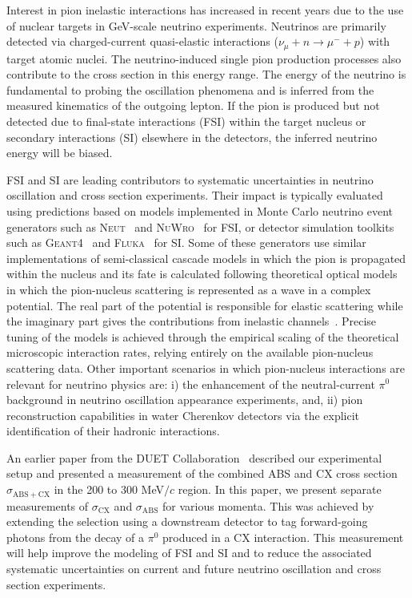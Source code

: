 Interest in pion inelastic interactions has increased in recent years due to the use of nuclear targets in GeV-scale neutrino experiments. Neutrinos are primarily detected via charged-current quasi-elastic interactions ($\nu_{\mu}+n\rightarrow \mu^{-} + p$) with target atomic nuclei. The neutrino-induced single pion production processes also contribute to the cross section in this energy range. The energy of the neutrino is fundamental to probing the oscillation phenomena and is inferred from the measured kinematics of the outgoing lepton. If the pion is produced but not detected due to final-state interactions (FSI) within the target nucleus or secondary interactions (SI) elsewhere in the detectors, the inferred neutrino energy will be biased. 

FSI and SI are leading contributors to systematic uncertainties in neutrino oscillation and cross section experiments. Their impact is typically evaluated using predictions based on models implemented in Monte Carlo neutrino event generators such as \textsc{Neut}~\cite{NEUT} and \textsc{NuWro}~\cite{NuWro} for FSI, or detector simulation toolkits such as \textsc{Geant4}~\cite{bertini} and \textsc{Fluka}~\cite{fluka1,fluka2} for SI. Some of these generators use similar implementations of semi-classical cascade models in which the pion is propagated within the nucleus and its fate is calculated following theoretical optical models in which the pion-nucleus scattering is represented as a wave in a complex potential. The real part of the potential is responsible for elastic scattering while the imaginary part gives the contributions from inelastic channels~\cite{Oset,Salcedo}. Precise tuning of the models is achieved through the empirical scaling of the theoretical microscopic interaction rates, relying entirely on the available pion-nucleus scattering data. Other important scenarios in which pion-nucleus interactions are relevant for neutrino physics are: i) the enhancement of the neutral-current $\pi^{0}$ background in neutrino oscillation appearance experiments, and, ii) pion reconstruction capabilities in water Cherenkov detectors via the explicit identification of their hadronic interactions.

An earlier paper from the DUET Collaboration~\cite{duet} described our experimental setup and presented a measurement of the combined ABS and CX cross section $\sigma_{\mathrm{ABS}+\mathrm{CX}}$ in the 200 to 300 MeV$/c$ region. In this paper, we present separate measurements of $\sigma_{\mathrm{CX}}$ and $\sigma_{\mathrm{ABS}}$ for various momenta. This was achieved by extending the selection using a downstream detector to tag forward-going photons from the decay of a $\pi^0$ produced in a CX interaction. This measurement will help improve the modeling of FSI and SI and to reduce the associated systematic uncertainties on current and future neutrino oscillation and cross section experiments.